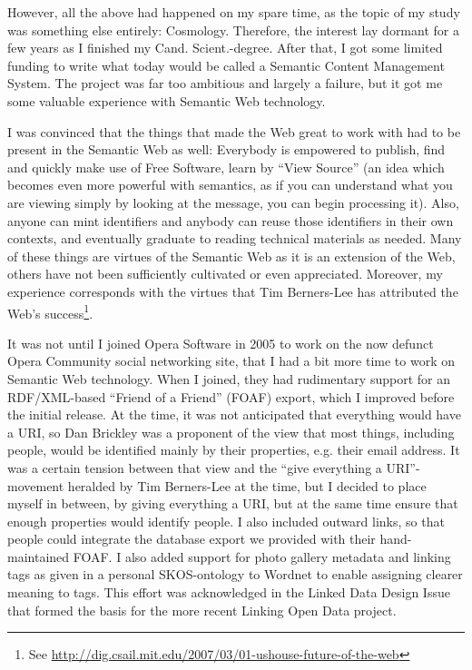 However, all the above had happened on my spare time, as the topic of
my study was something else entirely: Cosmology. Therefore, the
interest lay dormant for a few years as I finished my
Cand. Scient.-degree.  After that, I got some limited funding to write
what today would be called a Semantic Content Management System. The
project was far too ambitious and largely a failure, but it got me
some valuable experience with Semantic Web technology.

I was convinced that the things that made the Web great to work with
had to be present in the Semantic Web as well: Everybody is empowered
to publish, find and quickly make use of Free Software, learn by
``View Source'' (an idea which becomes even more powerful with
semantics, as if you can understand what you are viewing simply by
looking at the message, you can begin processing it). Also, anyone can mint
identifiers and anybody can reuse those identifiers in their own
contexts, and eventually graduate to reading technical materials as
needed. Many of these things are virtues of the Semantic Web as it is
an extension of the Web, others have not been sufficiently cultivated
or even appreciated. Moreover, my experience corresponds with the
virtues that Tim Berners-Lee has attributed the Web's success\footnote{See
  \url{http://dig.csail.mit.edu/2007/03/01-ushouse-future-of-the-web}}.

It was not until I joined Opera Software in 2005 to work on the now
defunct Opera Community social networking site, that I had a bit more
time to work on Semantic Web technology. When I joined, they had
rudimentary support for an RDF/XML-based ``Friend of a Friend'' (FOAF)
export, which I improved before the initial release. At the time, it
was not anticipated that everything would have a URI, so Dan Brickley
was a proponent of the view that most things, including people, would
be identified mainly by their properties, e.g. their email address. It
was a certain tension between that view and the ``give everything a
URI''-movement heralded by Tim Berners-Lee at the time, but I decided
to place myself in between, by giving everything a URI, but at the
same time ensure that enough properties would identify people. I also
included outward links, so that people could integrate the database
export we provided with their hand-maintained FOAF. I also added
support for photo gallery metadata and linking tags as given in a
personal SKOS-ontology to Wordnet to enable assigning clearer meaning
to tags. This effort was acknowledged in the Linked Data Design
Issue\cite{linkeddataissue} that formed the basis for the more recent Linking
Open Data project.

